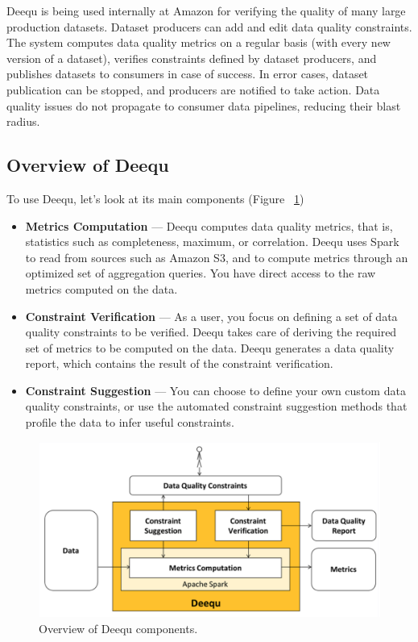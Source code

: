 Deequ is being used internally at Amazon for verifying the quality of many large production datasets. Dataset producers can add and edit data quality constraints. The system computes data quality metrics on a regular basis (with every new version of a dataset), verifies constraints defined by dataset producers, and publishes datasets to consumers in case of success. In error cases, dataset publication can be stopped, and producers are notified to take action. Data quality issues do not propagate to consumer data pipelines, reducing their blast radius.
\subsection{Overview of Deequ}

To use Deequ, let's look at its main components (Figure ~\ref{fig:deeaqu})

\begin{itemize}
	\item {
		\textbf{Metrics Computation} — Deequ computes data quality metrics, that is, statistics such as completeness, maximum, or correlation. Deequ uses Spark to read from sources such as Amazon S3, and to compute metrics through an optimized set of aggregation queries. You have direct access to the raw metrics computed on the data.
	}
\item {
	\textbf{Constraint Verification} — As a user, you focus on defining a set of data quality constraints to be verified. Deequ takes care of deriving the required set of metrics to be computed on the data. Deequ generates a data quality report, which contains the result of the constraint verification.
}
\item {
	\textbf{Constraint Suggestion} — You can choose to define your own custom data quality constraints, or use the automated constraint suggestion methods that profile the data to infer useful constraints.
}
\end{itemize}

\begin{figure}[H]
	\centering
	\includegraphics[scale=.4]{deeaqu}
	\caption{Overview of Deequ components.}
	\label{fig:deeaqu}
\end{figure}




